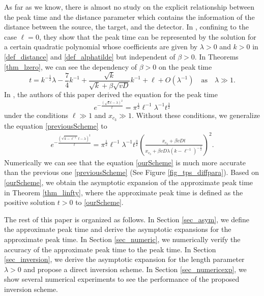 \documentclass[10pt]{article}
\numberwithin{equation}{section}
\numberwithin{figure}{section}
\begin{document}
As far as we know, there is almost no study on the explicit relationship between the peak time and the distance parameter which contains the information of the distance between the source, the target, and the detector. In \cite{Eom2023a}, confining to the case $\ell=0$, they show that the peak time can be represented by the solution for a certain quadratic polynomial whose coefficients are given by $\lambda>0$ and $k>0$ in \eqref{def_distance} and \eqref{def_alphatilde} but independent of $\beta>0$. 
In Theorems \ref{thm_lzero}, we can see the dependency of
$\beta>0$ on the peak time
\begin{equation*}
t =  k^{-\frac{1}{2}}\lambda - \frac{7}{4}k^{-1} + \frac{\sqrt{k}}{\sqrt{k}+\beta\sqrt{vD}}k^{-1} + \ell + O\left(\lambda^{-1}\right) \quad \mbox{as} \quad \lambda \gg 1. 
\end{equation*}
In \cite{Chen2025}, the authors of this paper derived the equation for the peak time
\begin{equation}\label{previousScheme}
 e^{-\frac{(\sqrt{k}t-\lambda)^2}{t}} = \pi^{\frac{1}{2}} \ell^{-1} \lambda^{-1} t^{\frac{3}{2}} 
\end{equation}
under the conditions $\ell \gg 1$ and $x_{c_3} \gg 1$.
Without these conditions, we generalize the equation \eqref{previousScheme} to 
\begin{equation}\label{ourScheme}
\begin{split}
 e^{-\frac{(\sqrt{k-\ell^{-1}}t-\lambda)^2}{t}} = \pi^{\frac{1}{2}} \ell^{-1} \lambda^{-1} t^{\frac{3}{2}} \left(\frac{x_{c_3}+\beta vDt }{x_{c_3}+\beta vD \lambda (k-\ell^{-1})^{-\frac{1}{2}}}\right)^2.
\end{split}
\end{equation}
Numerically we can see that the equation \eqref{ourScheme} is much more accurate than the previous one \eqref{previousScheme} (See Figure \ref{fig_tps_diffpara}). Based on \eqref{ourScheme}, we obtain the asymptotic expansion of the approximate peak time in Theorem \ref{thm_linfty}, where the approximate peak time is defined as the positive solution $t>0$ to \eqref{ourScheme}.  

The rest of this paper is organized as follows. In Section \ref{sec_asym}, we define the approximate peak time and derive the asymptotic expansions for the approximate peak time. In Section \ref{sec_numeric}, we numerically verify the accuracy of the approximate peak time to the peak time. In Section \ref{sec_inversion}, we derive the asymptotic expansion for the length parameter $\lambda>0$ and propose a direct inversion scheme. In Section \ref{sec_numericexp}, we show several numerical experiments to see the performance of the proposed inversion scheme.
\end{document}
